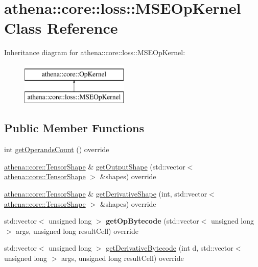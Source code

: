 \hypertarget{classathena_1_1core_1_1loss_1_1_m_s_e_op_kernel}{}\section{athena\+:\+:core\+:\+:loss\+:\+:M\+S\+E\+Op\+Kernel Class Reference}
\label{classathena_1_1core_1_1loss_1_1_m_s_e_op_kernel}
Inheritance diagram for athena\+:\+:core\+:\+:loss\+:\+:M\+S\+E\+Op\+Kernel\+:\begin{figure}[H]
\begin{center}
\leavevmode
\includegraphics[height=2.000000cm]{df/d1d/classathena_1_1core_1_1loss_1_1_m_s_e_op_kernel}
\end{center}
\end{figure}
\subsection*{Public Member Functions}
\begin{DoxyCompactItemize}
\item 
int \mbox{\hyperlink{classathena_1_1core_1_1loss_1_1_m_s_e_op_kernel_ab851ee62ea95c3aab8aab2d28cfa9d04}{get\+Operands\+Count}} () override
\item 
\mbox{\hyperlink{classathena_1_1core_1_1_tensor_shape}{athena\+::core\+::\+Tensor\+Shape}} \& \mbox{\hyperlink{classathena_1_1core_1_1loss_1_1_m_s_e_op_kernel_a23aacffbbc73b177535511702f3c441d}{get\+Output\+Shape}} (std\+::vector$<$ \mbox{\hyperlink{classathena_1_1core_1_1_tensor_shape}{athena\+::core\+::\+Tensor\+Shape}} $>$ \&shapes) override
\item 
\mbox{\hyperlink{classathena_1_1core_1_1_tensor_shape}{athena\+::core\+::\+Tensor\+Shape}} \& \mbox{\hyperlink{classathena_1_1core_1_1loss_1_1_m_s_e_op_kernel_a68a0220e3a3591638c7725b5cb659609}{get\+Derivative\+Shape}} (int, std\+::vector$<$ \mbox{\hyperlink{classathena_1_1core_1_1_tensor_shape}{athena\+::core\+::\+Tensor\+Shape}} $>$ \&shapes) override
\item 
\mbox{\label{classathena_1_1core_1_1loss_1_1_m_s_e_op_kernel_a86e6436fad7cad62c235dcde0f3991ce}} 
std\+::vector$<$ unsigned long $>$ {\bfseries get\+Op\+Bytecode} (std\+::vector$<$ unsigned long $>$ args, unsigned long result\+Cell) override
\item 
std\+::vector$<$ unsigned long $>$ \mbox{\hyperlink{classathena_1_1core_1_1loss_1_1_m_s_e_op_kernel_a2d1fc6b2900abc3ebd0466c8de3e68e2}{get\+Derivative\+Bytecode}} (int d, std\+::vector$<$ unsigned long $>$ args, unsigned long result\+Cell) override
\end{DoxyCompactItemize}
